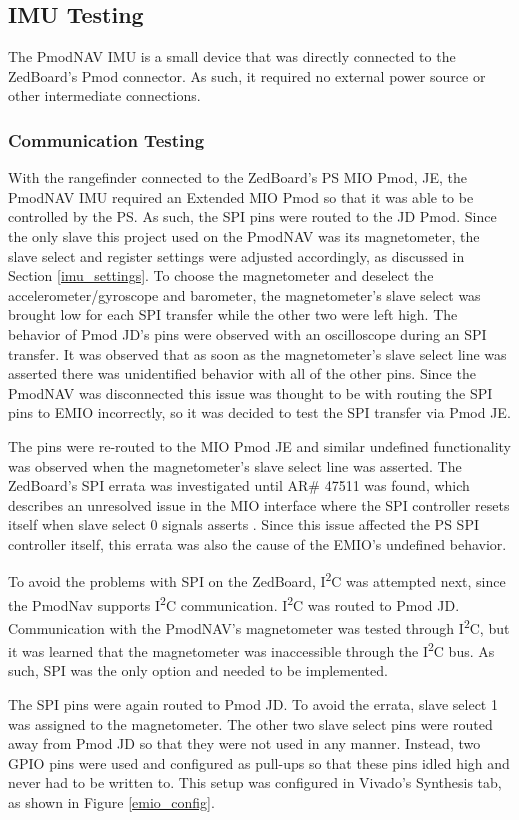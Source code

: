 \subsection{IMU Testing}
The PmodNAV IMU is a small device that was directly connected to the ZedBoard's Pmod connector. As such, it required no external power source or other intermediate connections.

\subsubsection{Communication Testing}
With the rangefinder connected to the ZedBoard's PS MIO Pmod, JE, the PmodNAV IMU required an Extended MIO Pmod so that it was able to be controlled by the PS. As such, the SPI pins were routed to the JD Pmod. Since the only slave this project used on the PmodNAV was its magnetometer, the slave select and register settings were adjusted accordingly, as discussed in Section \ref{imu_settings}. To choose the magnetometer and deselect the accelerometer/gyroscope and barometer, the magnetometer's slave select was brought low for each SPI transfer while the other two were left high. The behavior of Pmod JD's pins were observed with an oscilloscope during an SPI transfer. It was observed that as soon as the magnetometer's slave select line was asserted there was unidentified behavior with all of the other pins. Since the PmodNAV was disconnected this issue was thought to be with routing the SPI pins to EMIO incorrectly, so it was decided to test the SPI transfer via Pmod JE.
\par
The pins were re-routed to the MIO Pmod JE and similar undefined functionality was observed when the magnetometer's slave select line was asserted. The ZedBoard's SPI errata was investigated until AR\# 47511 was found, which describes an unresolved issue in the MIO interface where the SPI controller resets itself when slave select 0 signals asserts \cite{zedboardErrata}. Since this issue affected the PS SPI controller itself, this errata was also the cause of the EMIO's undefined behavior.
\par
To avoid the problems with SPI on the ZedBoard, I\textsuperscript{2}C was attempted next, since the PmodNav supports I\textsuperscript{2}C communication. I\textsuperscript{2}C was routed to Pmod JD. Communication with the PmodNAV's magnetometer was tested through I\textsuperscript{2}C, but it was learned that the magnetometer was inaccessible through the I\textsuperscript{2}C bus. As such, SPI was the only option and needed to be implemented.
\par
The SPI pins were again routed to Pmod JD. To avoid the errata, slave select 1 was assigned to the magnetometer. The other two slave select pins were routed away from Pmod JD so that they were not used in any manner. Instead, two GPIO pins were used and configured as pull-ups so that these pins idled high and never had to be written to. This setup was configured in Vivado's Synthesis tab, as shown in Figure \ref{emio_config}. 

